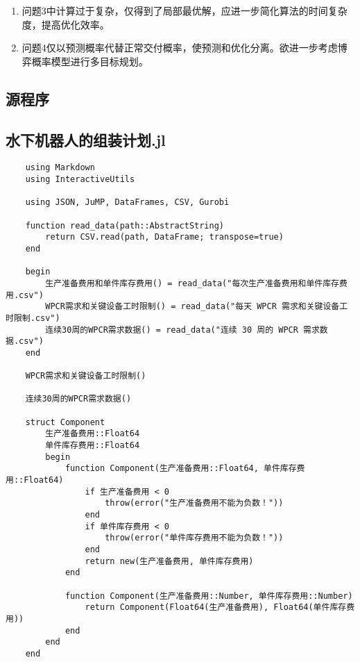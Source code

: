 \begin{enumerate}
    \item 问题3中计算过于复杂，仅得到了局部最优解，应进一步简化算法的时间复杂度，提高优化效率。
    \item 问题4仅以预测概率代替正常交付概率，使预测和优化分离。欲进一步考虑博弈概率模型进行多目标规划。
\end{enumerate}




\printbibliography
\newpage
\begin{appendices}

\section{源程序}


\subsection{水下机器人的组装计划.jl} %
\begin{lstlisting}
    using Markdown
    using InteractiveUtils

    using JSON, JuMP, DataFrames, CSV, Gurobi

    function read_data(path::AbstractString)
        return CSV.read(path, DataFrame; transpose=true)
    end

    begin
        生产准备费用和单件库存费用() = read_data("每次生产准备费用和单件库存费用.csv")
        WPCR需求和关键设备工时限制() = read_data("每天 WPCR 需求和关键设备工时限制.csv")
        连续30周的WPCR需求数据() = read_data("连续 30 周的 WPCR 需求数据.csv")
    end

    WPCR需求和关键设备工时限制()

    连续30周的WPCR需求数据()

    struct Component
        生产准备费用::Float64
        单件库存费用::Float64
        begin
            function Component(生产准备费用::Float64, 单件库存费用::Float64)
                if 生产准备费用 < 0
                    throw(error("生产准备费用不能为负数！"))
                end
                if 单件库存费用 < 0
                    throw(error("单件库存费用不能为负数！"))
                end
                return new(生产准备费用, 单件库存费用)
            end

            function Component(生产准备费用::Number, 单件库存费用::Number)
                return Component(Float64(生产准备费用), Float64(单件库存费用))
            end
        end
    end


\end{lstlisting}
\end{appendices}
